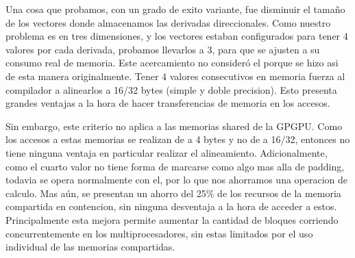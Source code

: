 Una cosa que probamos, con un grado de exito variante, fue disminuir el tamaño de los vectores
donde almacenamos las derivadas direccionales. Como nuestro problema es en tres dimensiones,
y los vectores estaban configurados para tener 4 valores por cada derivada, probamos llevarlos a
3, para que se ajusten a su consumo real de memoria. Este acercamiento no consider\'o el porque
se hizo asi de esta manera originalmente. Tener 4 valores consecutivos en memoria fuerza
al compilador a alinearlos a 16/32 bytes (simple y doble precision).
Esto presenta grandes ventajas a la hora de hacer transferencias de memoria en los accesos.

Sin embargo, este criterio no aplica a las memorias shared de la GPGPU. Como los accesos
a estas memorias se realizan de a 4 bytes y no de a 16/32, entonces no tiene ninguna ventaja
en particular realizar el alineamiento. Adicionalmente, como el cuarto valor no tiene forma de marcarse
como algo mas alla de padding, todavia se opera normalmente con el, por lo que nos ahorramos una
operacion de calculo. Mas a\'un, se presentan un ahorro del 25\% de los recursos de la memoria compartida
en contencion, sin ninguna desventaja a la hora de acceder a estos. Principalmente
esta mejora permite aumentar la cantidad de bloques corriendo concurrentemente en los multiprocesadores,
sin estas limitados por el uso individual de las memorias compartidas.
